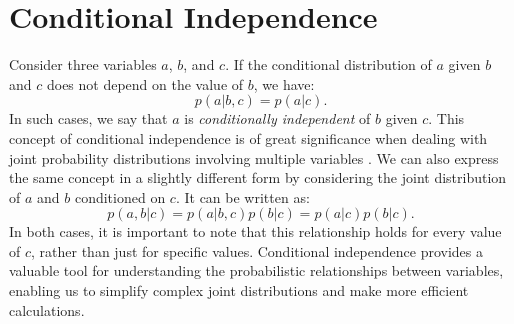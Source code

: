 \section{Conditional Independence}\label{appendix:defs:conditional-independence}

Consider three variables $a$, $b$, and $c$.
If the conditional distribution of $a$ given $b$ and $c$ does not depend on the value of $b$,
we have: \begin{equation}
\label{eq:appendix:defs:independence} p(a\vert b, c) = p(a\vert c).
\end{equation} In such cases, we say that $a$ is \textit{conditionally
  independent} of $b$ given $c$.
This concept of conditional independence is of great significance when dealing with joint
probability distributions involving multiple variables \citep{dawid_conditional_independence}.
We can also express the same concept in a slightly different form by considering the joint
distribution of $a$ and $b$ conditioned on $c$.
It can be written as: \begin{equation}
\label{eq:appendix:defs:independence2} p(a, b\vert c) = p(a\vert b, c)p(b\vert c) = p(a\vert c)p(b\vert c).
\end{equation} In both cases, it is important to note that this
relationship holds for every value of $c$, rather than just for specific values.
Conditional independence provides a valuable tool for understanding the probabilistic
relationships between variables, enabling us to simplify complex joint distributions and make
more efficient calculations.
